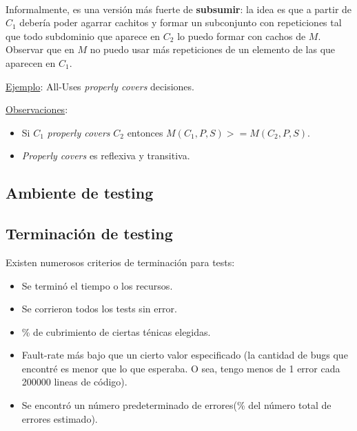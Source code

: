 \documentclass[]{article}
\begin{document}
~\newline

Informalmente, es una versión más fuerte de \textbf{subsumir}: la idea es que a partir de $C_1$ debería poder agarrar cachitos y formar un subconjunto con repeticiones tal que todo subdominio que aparece en $C_2$ lo puedo formar con cachos de $M$. Observar que en $M$ no puedo usar más repeticiones de un elemento de las que aparecen en $C_1$.
~\newline

\underline{Ejemplo}: All-Uses \textit{properly covers} decisiones.
~\newline

\underline{Observaciones}:
\begin{itemize}
	\item Si $C_1$ \textit{properly covers} $C_2$ entonces $M(C_1, P, S) >= M (C_2, P,S)$.
	\item \textit{Properly covers} es reflexiva y transitiva.
\end{itemize}

\subsection{Ambiente de testing}

\subsection{Terminación de testing}
Existen numerosos criterios de terminación para tests:
\begin{itemize}
	\item Se terminó el tiempo o los recursos.
	\item Se corrieron todos los tests sin error.
	\item \% de cubrimiento de ciertas ténicas elegidas.
	\item Fault-rate más bajo que un cierto valor especificado (la cantidad de bugs que encontré es menor que lo que esperaba. O sea, tengo menos de 1 error cada 200000 lineas de código).
	\item Se encontró un número predeterminado de errores(\% del número total de errores estimado).
\end{itemize}
\end{document}
